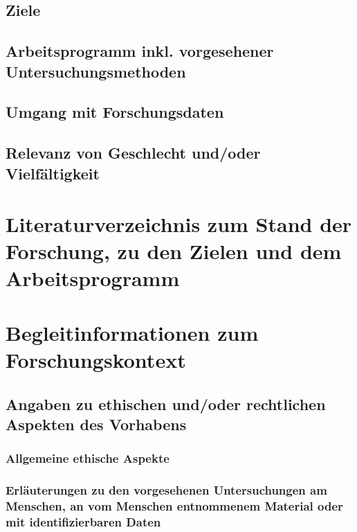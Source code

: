 \documentclass[de]{dfg-proposal}
\begin{document}
        \subsection{Ziele}

        \subsection{Arbeitsprogramm inkl. vorgesehener Untersuchungsmethoden}

        \subsection{Umgang mit Forschungsdaten}

        \subsection{Relevanz von Geschlecht und/oder Vielfältigkeit}


    \section{Literaturverzeichnis zum Stand der Forschung, zu den Zielen und dem Arbeitsprogramm}

        \printbibliography

        \partbreak


    \section{Begleitinformationen zum Forschungskontext}

        \subsection{Angaben zu ethischen und/oder rechtlichen Aspekten des Vorhabens}

            \subsubsection{Allgemeine ethische Aspekte}

            \subsubsection{Erläuterungen zu den vorgesehenen Untersuchungen am Menschen, an vom Menschen entnommenem Material oder mit identifizierbaren Daten}
\end{document}
